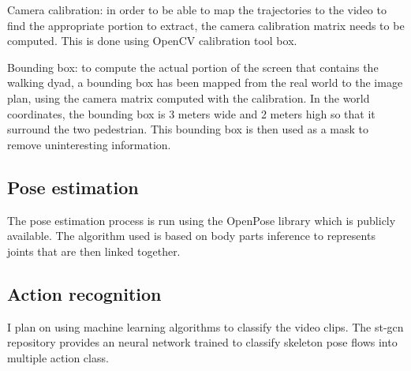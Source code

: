 \documentclass[12pt,a4paper,twoside]{article}
\begin{document}
Camera calibration: in order to be able to map the trajectories to the video to find the appropriate portion to extract, the camera calibration matrix needs to be computed. This is done using OpenCV calibration tool box. 

Bounding box: to compute the actual portion of the screen that contains the walking dyad, a bounding box has been mapped from the real world to the image plan, using the camera matrix computed with the calibration. In the world coordinates, the bounding box is 3 meters wide and 2 meters high so that it surround the two pedestrian. This bounding box is then used as a mask to remove uninteresting information.

\subsection{Pose estimation}
The pose estimation process is run using the OpenPose library which is publicly available. The algorithm used is based on body parts inference to represents joints that are then linked together.

\subsection{Action recognition}
I plan on using machine learning algorithms to classify the video clips. The st-gcn repository provides an neural network trained to classify skeleton pose flows into multiple action class.
\end{document}
